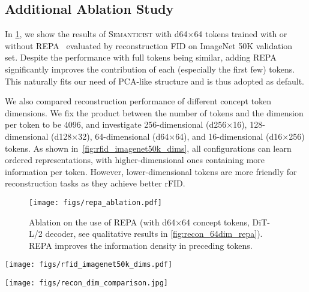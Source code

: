 \documentclass[10pt,twocolumn,letterpaper]{article}
\DeclareRobustCommand{\modelname}{\textsc{Semanticist}\xspace}
\begin{document}
\subsection{Additional Ablation Study}\label{sec:ablation_ext}

In \cref{fig:repa_ablation}, we show the results of \modelname with d64$\times$64 tokens trained with or without REPA~\cite{repa} evaluated by reconstruction FID on ImageNet 50K validation set. Despite the performance with full tokens being similar, adding REPA significantly improves the contribution of each (especially the first few) tokens. This naturally fits our need of PCA-like structure and is thus adopted as default.

We also compared reconstruction performance of different concept token dimensions. We fix the product between the number of tokens and the dimension per token to be 4096, and investigate 256-dimensional (d256$\times$16), 128-dimensional (d128$\times$32), 64-dimensional (d64$\times$64), and 16-dimensional (d16$\times$256) tokens. As shown in~\cref{fig:rfid_imagenet50k_dims}, all configurations can learn ordered representations, with higher-dimensional ones containing more information per token. However, lower-dimensional tokens are more friendly for reconstruction tasks as they achieve better rFID.

\begin{figure}[t]
    \centering
    \texttt{[image: figs/repa\_ablation.pdf]}
    \caption{Ablation on the use of REPA (with d64$\times$64 concept tokens, DiT-L/2 decoder, see qualitative results in \cref{fig:recon_64dim_repa}). REPA improves the information density in preceding tokens.}
    \label{fig:repa_ablation}
\end{figure}




\begin{figure*}[t]
    \centering
    \texttt{[image: figs/rfid\_imagenet50k\_dims.pdf]}
    \caption{Reconstruction performance of different encoder configurations on ImageNet val 50K benchmark. A larger number of lower-dimensional tokens is more friendly for reconstruction tasks.} \label{fig:rfid_imagenet50k_dims}
\end{figure*}

\begin{figure*}[t]
    \centering
    \texttt{[image: figs/recon\_dim\_comparison.jpg]}
    \caption{Qualitative results of different token dimensions. Higher dimensional tokens encode more information, and lower dimensional tokens achieve clearer semantic decoupling and achieve better reconstruction.}
    \label{fig:recon_dim_comparison}
\end{figure*}
\end{document}

